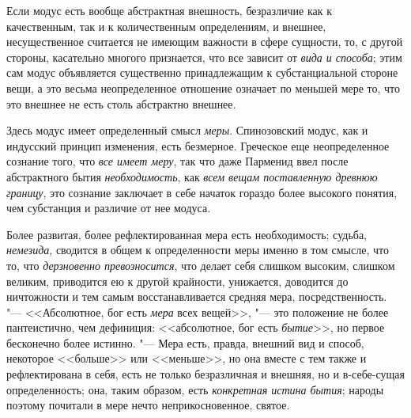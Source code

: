 Если модус есть вообще абстрактная внешность, безразличие как к
качественным, так и к количественным определениям, и внешнее,
несущественное считается не имеющим важности в сфере сущности, то, с другой
стороны, касательно многого признается, что все зависит от
{\em вида и способа}; этим сам модус объявляется
существенно принадлежащим к субстанциальной стороне вещи, а это весьма
неопределенное отношение означает по меньшей мере то, что это внешнее не
есть столь абстрактно внешнее.

Здесь модус имеет определенный смысл {\em меры}.
Спинозовский модус, как и индусский принцип изменения, есть безмерное.
Греческое еще неопределенное сознание того, что
{\em все имеет меру}, так что даже Парменид ввел после
абстрактного бытия {\em необходимость}, как
{\em всем вещам поставленную древнюю границу}, это
сознание заключает в себе начаток гораздо более высокого понятия, чем
субстанция и различие от нее модуса.

Более развитая, более рефлектированная мера есть необходимость; судьба,
{\em немезида}, сводится в общем к определенности меры
именно в том смысле, что то, что {\em дерзновенно
превозносится}, что делает себя слишком высоким, слишком великим,
приводится ею к другой крайности, унижается, доводится до ничтожности и тем
самым восстанавливается средняя мера, посредственность. "--- <<Абсолютное, бог
есть {\em мера} всех вещей>>, "--- это положение не более
пантеистично, чем дефиниция: <<абсолютное, бог есть
{\em бытие}>>, но первое бесконечно более истинно. "---
Мера есть, правда, внешний вид и способ, некоторое <<больше>> или <<меньше>>,
но она вместе с тем также и рефлектирована в себя, есть не только
безразличная и внешняя, но и в-себе-сущая определенность; она, таким
образом, есть {\em конкретная истина бытия}; народы
поэтому почитали в мере нечто неприкосновенное, святое.

